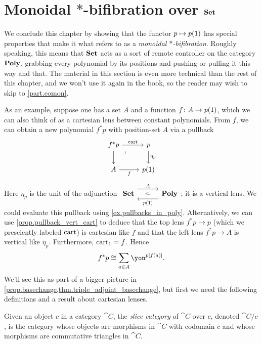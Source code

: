 \documentclass[Book-Poly]{subfiles}
\begin{document}

\section{Monoidal $*$-bifibration over $\mathbf{Set}$}


We conclude this chapter by showing that the functor $p\mapsto p(\textsf{1})$ has special properties that make it what \cite{shulman2008framed} refers to as a \emph{monoidal $*$-bifibration}.
Roughly speaking, this means that $\mathbf{Set}$ acts as a sort of remote controller on the category $\mathbf{Poly}$, grabbing every polynomial by its positions and pushing or pulling it this way and that.
The material in this section is even more technical than the rest of this chapter, and we won't use it again in the book, so the reader may wish to skip to \cref{part.comon}.

As an example, suppose one has a set $A$ and a function $f\colon A\to p(\textsf{1})$, which we can also think of as a cartesian lens between constant polynomials.
From $f$, we can obtain a new polynomial $f^*p$ with position-set $A$ via a pullback
\begin{equation}\label{eqn.f^*_defined}
\begin{tikzcd}
	f^*p\ar[r, "\fun{cart}"]\ar[d]&
	p\ar[d, "\eta_p"]\\
	A\ar[r, "f"']&
	p(\1)\ar[ul, phantom, very near end, "\lrcorner"]
\end{tikzcd}
\end{equation}
Here $\eta_p$ is the unit of the adjunction $\adjr{\smset}{A}{p(\1)}{\poly}$; it is a vertical lens.
We could evaluate this pullback using \cref{ex.pullbacks_in_poly}.
Alternatively, we can use \cref{prop.pullback_vert_cart} to deduce that the top lens $f^*p\to p$ (which we presciently labeled $\mathrm{cart}$) is cartesian like $f$ and that the left lens $f^*p\to A$ is vertical like $\eta_p$. Furthermore, $\mathrm{cart}_1 = f$.
Hence
\[
    f^*p \iso \sum_{a \in A} \yon^{p[f(a)]}.
\]
We'll see this as part of a bigger picture in \cref{prop.basechange,thm.triple_adjoint_basechange}, but first we need the following definitions and a result about cartesian lenses.

\begin{definition} \label{def.slice}
Given an object $c$ in a category $\cat{C}$, the \emph{slice category} of $\cat{C}$ over $c$, denoted $\cat{C}/c$, is the category whose objects are morphisms in $\cat{C}$ with codomain $c$ and whose morphisms are commutative triangles in $\cat{C}$.
\end{definition}
\end{document}
